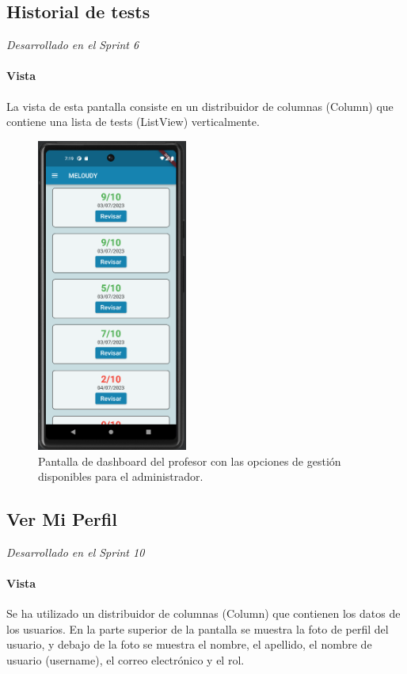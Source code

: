 \newpage

\subsection{Historial de tests}
\textit{Desarrollado en el Sprint 6}
\label{sec:historial}

\paragraph*{Vista}
\label{sec:vista}
La vista de esta pantalla consiste en un distribuidor de columnas (Column) que contiene una lista de tests (ListView) verticalmente. 

\begin{figure}[H]
  \centering
  \includegraphics[width=0.44\textwidth]{imagenes/c7/historialtest.png}
  \caption{Pantalla de dashboard del profesor con las opciones de gestión disponibles para el administrador.}
  \label{fig:login}
\end{figure}


\subsection{Ver Mi Perfil}
\textit{Desarrollado en el Sprint 10}
\label{sec:miperfil}

\paragraph*{Vista}
\label{sec:vista}
Se ha utilizado un distribuidor de columnas (Column) que contienen los datos de los usuarios.
En la parte superior de la pantalla se muestra la foto de perfil del usuario, y debajo de la foto se muestra el nombre, 
el apellido, el nombre de usuario (username), el correo electrónico y el rol.


